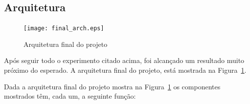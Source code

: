 \documentclass[11pt,twoside]{article}
\begin{document}
\subsection{Arquitetura}

\begin{figure}[!h]
  \centering
  \texttt{[image: final\_arch.eps]}
  \caption{Arquitetura final do projeto}
  \label{fig:finalArch}
\end{figure}

Após seguir todo o experimento citado acima, foi alcançado um resultado muito próximo do esperado. A arquitetura final do projeto, está mostrada na Figura~\ref{fig:finalArch}.

Dada a arquitetura final do projeto mostra na Figura~\ref{fig:finalArch} os componentes mostrados têm, cada um, a seguinte função:
\end{document}
